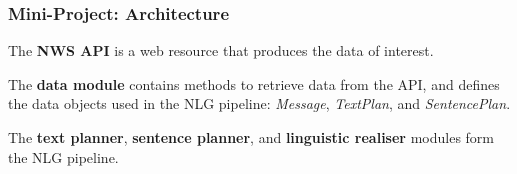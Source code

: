 \begin{frame}
\frametitle{Mini-Project: Architecture}

\begin{center}

\end{center}

\vspace{12pt}

The \textbf{NWS API} is a web resource that produces the data of interest.

\vspace{12pt}

The \textbf{data module} contains methods to retrieve data from the API,
and defines the data objects used in the NLG pipeline:
\textit{Message}, \textit{TextPlan}, and \textit{SentencePlan}.

\vspace{12pt}

The \textbf{text planner}, \textbf{sentence planner},
and \textbf{linguistic realiser} modules form the NLG pipeline.

\end{frame}